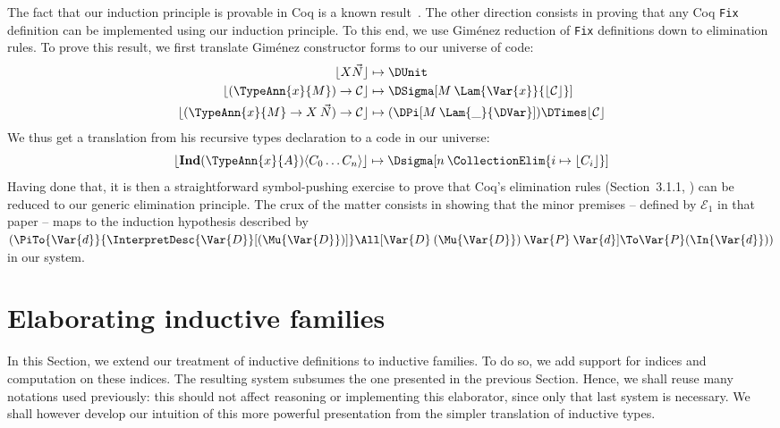 \documentclass{scrartcl}
\theoremstyle{plain}
\theoremstyle{definition}
\begin{document}
The fact that our induction principle is provable in Coq is a known
result~\citep{dagand:levitation}. The other direction consists in
proving that any Coq \texttt{Fix} definition can be implemented using
our induction principle. To this end, we use Gim\'{e}nez reduction of
\texttt{Fix} definitions down to elimination rules. To prove this
result, we first translate Gim\'{e}nez constructor forms to our
universe of code:
\begin{align*}
  \InterpretConstForm{X \vec{N}} 
      &\mapsto
          \DUnit \\
  \InterpretConstForm{(\TypeAnn{x}{M}) \to \mathcal{C}}
      &\mapsto
          \DSigma[M\: \Lam{\Var{x}}{\InterpretConstForm{\mathcal{C}}}] \\
  \InterpretConstForm{(\TypeAnn{x}{M} \to X\: \vec{N}) \to \mathcal{C}}
      &\mapsto
          (\DPi[M\: \Lam{\_}{\DVar}]) \DTimes \InterpretConstForm{\mathcal{C}}
\end{align*}
We thus get a translation from his recursive types declaration to a code in our
universe:
\[
\InterpretConstForm{\mathbf{Ind}(\TypeAnn{x}{A})\langle C_0 \ldots C_n \rangle}
    \mapsto 
    \Dsigma[n\: \CollectionElim{i \mapsto \InterpretConstForm{C_i}}]
\]
Having done that, it is then a straightforward symbol-pushing exercise
to prove that Coq's elimination rules (Section~3.1.1,
\citep{gimenez:coq-induction}) can be reduced to our generic
elimination principle. The crux of the matter consists in showing that
the minor premises -- defined by \(\mathcal{E}_1\) in that paper --
maps to the induction hypothesis described by
\((\PiTo{\Var{d}}{\InterpretDesc{\Var{D}}[(\Mu{\Var{D}})]}
\All[\Var{D}\: (\Mu{\Var{D}})\: \Var{P}\: \Var{d}] \To \Var{P}
(\In{\Var{d}}))\) in our system.







\section{Elaborating inductive families}
\label{sec:elab-data-family}



In this Section, we extend our treatment of inductive definitions to
inductive families. To do so, we add support for indices and
computation on these indices. The resulting system subsumes the one
presented in the previous Section. Hence, we shall reuse many
notations used previously: this should not affect reasoning or
implementing this elaborator, since only that last system is
necessary. We shall however develop our intuition of this more
powerful presentation from the simpler translation of inductive types.
\end{document}
